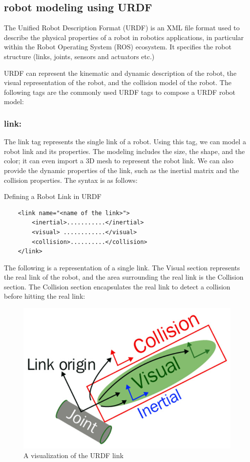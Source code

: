 \documentclass[../../main]{subfiles}
\begin{document}
\lstset{language=XML}

\subsection{robot modeling using URDF}
The Unified Robot Description Format (URDF) is an XML file format used to describe the physical properties of a robot in robotics applications, in particular within the Robot Operating System (ROS) ecosystem. It specifies the robot structure (links, joints, sensors and actuators etc.)

URDF can represent the kinematic and dynamic description of the robot, the visual
representation of the robot, and the collision model of the robot.
The following tags are the commonly used URDF tags to compose a URDF robot model:

\subsubsection{link:}\label{tags}
The link tag represents the single link of a robot. Using this tag, we can
model a robot link and its properties. The modeling includes the size, the shape,
and the color; it can even import a 3D mesh to represent the robot link. We can
also provide the dynamic properties of the link, such as the inertial matrix and the
collision properties.
The syntax is as follows:

\begin{codebox}[]{Defining a Robot Link in URDF}
  \begin{verbatim}
    <link name="<name of the link>">
        <inertial>...........</inertial>
        <visual> ............</visual>
        <collision>..........</collision>
    </link>
\end{verbatim}
  \end{codebox}
The following is a representation of a single link. The Visual section represents the
real link of the robot, and the area surrounding the real link is the Collision section.
The Collision section encapsulates the real link to detect a collision before hitting
the real link:
\begin{figure}[h]
\centering
\includegraphics{sublatex/hashem/img/link1.jpg}
\caption{A visualization of the URDF link\cite{joseph2018mastering}}
\end{figure}
\end{document}
